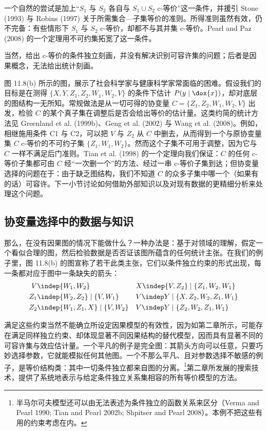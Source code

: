 一个自然的尝试是加上“$S_1$ 与 $S_2$ 各自与 $S_1\cup S_2$ c-等价”这一条件，并援引 Stone (1993) 与 Robins (1997) 关于所需集合—子集等价的准则。所得准则虽然有效，仍不完备：有些情形下 $S_1$ 与 $S_2$ c-等价，却都不与其并集 c-等价。Pearl and Paz (2008) 的一个定理用不可约集拓宽了这一条件。

当然，给出 c-等价的条件独立刻画，并没有解决识别可容许集的问题；后者是因果概念，无法给出统计刻画。

图 11.8(b) 所示的图，展示了社会科学家与健康科学家常面临的困难。假设我们的目标是在测得 $\{X,Y,Z_1,Z_2,W_1,W_2,V\}$ 的条件下估计 $P(y\mid\dox{x})$，却对底层的图结构一无所知。常规做法是从一切可得的协变量 $C=\{Z_1,Z_2,W_1,W_2,V\}$ 出发，检验 $C$ 的某个真子集在调整后是否会给出等价的估计量。这类约简的统计方法见 Greenland et al. (1999b)、Geng et al. (2002) 与 Wang et al. (2008)。例如，相继施用条件 C1 与 C2，可以把 $V$ 与 $Z_2$ 从 $C$ 中删去，从而得到一个与原协变量集 $C$ c-等价的不可约子集 $\{Z_1,W_1,W_2\}$。然而这个子集不可用于调整，因为它与 $C$ 一样不满足后门准则。Tian et al. (1998) 的一个定理向我们保证：$C$ 的任何 c-等价子集都可由 $C$ 经“一次删一个”的方法、经过一串 c-等价子集到达；但协变量选择的问题在于：由于缺乏图结构，我们不知道 $C$ 的众多子集中哪一个（如果有的话）可容许。下一小节讨论如何借助外部知识以及对现有数据的更精细分析来处理这个问题。

\subsection{协变量选择中的数据与知识}

那么，在没有因果图的情况下能做什么？一种办法是：基于对领域的理解，假定一个看似合理的图，然后检验数据是否否证该图所蕴含的任何统计主张。在我们的例子里，图 11.8(b) 的图宣称了若干此类主张，它们以条件独立约束的形式出现，每一条都对应于图中一条缺失的箭头：
\[
\begin{aligned}
V &\indep \{W_1,W_2\} && X\indep\{V,Z_2\}\mid\{Z_1,W_2,W_1\}\\
Z_1 &\indep \{W_2,Z_2\}\mid\{V,W_1\} && V\indep Y\mid\{X,Z_2,W_2,Z_1,W_1\}\\
Z_2 &\indep \{W_1,Z_1,X\}\mid\{V,W_2\} && V\indep Y\mid\{Z_2,W_2,Z_1,W_1\}
\end{aligned}
\]

满足这些约束当然不能确立所设定因果模型的有效性，因为如第二章所示，可能存在满足同样独立约束、却体现显著不同因果结构的替代模型，因而具有显著不同的可容许集与效应估计量。一个平凡的例子是完全图：其箭头方向可以任意，只要巧妙选择参数，它就能模拟任何其他图。一个不那么平凡、且对参数选择不敏感的例子，是等价结构类：其中一切条件独立都来自图的分离。\footnote{半马尔可夫模型还可以由无法表述为条件独立的函数关系来区分（Verma and Pearl 1990; Tian and Pearl 2002b; Shpitser and Pearl 2008）。本例不把这些有用的约束考虑在内。}第二章所发展的搜索技术，提供了系统地表示与给定条件独立关系集相容的所有等价模型的方法。

